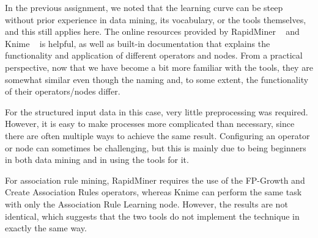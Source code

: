 \label{chap:tool-insights}

In the previous assignment, we noted that the learning curve can be steep without prior experience
in data mining, its vocabulary, or the tools themselves, and this still applies here. The  online
resources provided by RapidMiner ~\cite{RapidMiner} and Knime ~\cite{Knime} is helpful, as well as built-in documentation that
explains the functionality and application of different operators and nodes. From a practical
perspective, now that we have become a bit more familiar with the tools, they are somewhat similar
even though the naming and, to some extent, the functionality of their operators/nodes differ.

For the structured input data in this case, very little preprocessing was required. However, it is
easy to make processes more complicated than necessary, since there are often multiple ways to
achieve the same result. Configuring an operator or node can sometimes be challenging, but this is
mainly due to being beginners in both data mining and in using the tools for it.

For association rule mining, RapidMiner requires the use of the FP-Growth and Create Association Rules
operators, whereas Knime can perform the same task with only the Association Rule Learning node. However,
the results are not identical, which suggests that the two tools do not implement the technique in exactly
the same way.
